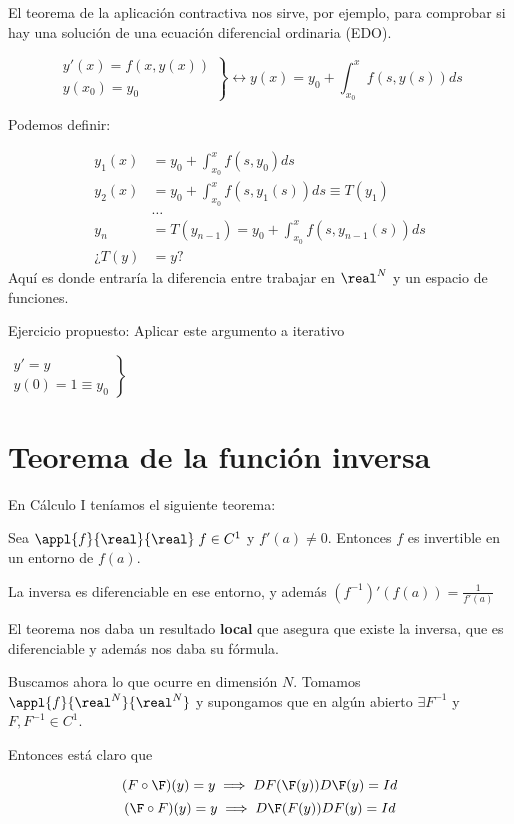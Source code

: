 El teorema de la aplicación contractiva nos sirve, por ejemplo, para comprobar si hay una solución de una ecuación diferencial ordinaria (EDO).

$$\left.\begin{matrix}y'(x) = f(x,y(x))\\
        y(x_0) = y_0
       \end{matrix}\right\} \leftrightarrow y(x) = y_0 + \int_{x_0}^x f(s,y(s)) ds$$

Podemos definir:

\begin{align*}
y_1(x) &= y_0 + \int_{x_0}^{x} f(s,y_0)ds\\
y_2(x) &= y_0 + \int_{x_0}^x f(s,y_1(s))ds \equiv T(y_1)\\
&\dots\\
y_n &= T(y_{n-1}) =  y_0 + \int_{x_0}^x f(s,y_{n-1}(s))ds\\
¿T(y) &= y?
\end{align*}
Aquí es donde entraría la diferencia entre trabajar en $\real^N$ y un espacio de funciones.

Ejercicio propuesto: Aplicar este argumento a iterativo

$\left. \begin{matrix} y' = y\\
         y(0) = 1 \equiv y_0
        \end{matrix}\right\}$


\section{Teorema de la función inversa}
En Cálculo I teníamos el siguiente teorema:
\begin{theorem} Sea $\appl{f}{\real}{\real}\; f\in C^1$ y $f'(a) \neq 0$. Entonces $f$ es invertible en un entorno de $f(a)$.

La inversa es diferenciable en ese entorno, y además $(f^{-1})'(f(a)) = \frac{1}{f'(a)}$
\end{theorem}

El teorema nos daba un resultado \textbf{local} que asegura que existe la inversa, que es diferenciable y además nos daba su fórmula.

Buscamos ahora lo que ocurre en dimensión $N$. Tomamos $\appl{f}{\real^N}{\real^N}$ y supongamos que en algún abierto $\exists F^{-1}$ y $F,F^{-1} \in  C^1$.

Entonces está claro que

\[ (F\circ \F)(y) = y \implies DF(\F(y))D\F(y) = Id \]
\[ (\F\circ F)(y) = y \implies D\F(F(y))DF(y) = Id \]


